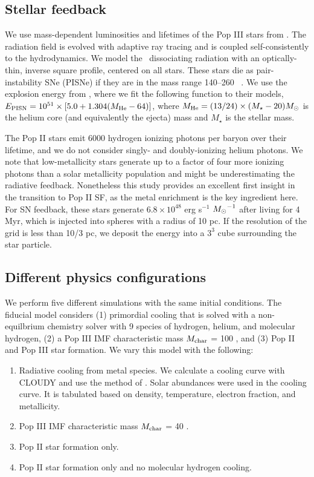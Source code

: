\documentclass[12pt,preprint]{aastex}
\begin{document}
\subsection{Stellar feedback}

We use mass-dependent luminosities and lifetimes of the Pop III stars
from \citet{Schaerer02}.  The radiation field is evolved with adaptive
ray tracing \citep{Abel02_RT, Wise10} and is coupled self-consistently
to the hydrodynamics.  We model the \hh~dissociating radiation with an
optically-thin, inverse square profile, centered on all stars.  These
stars die as pair-instability SNe (PISNe) if they are in the mass
range 140--260 \Ms~\citep{Heger03}.  We use the explosion energy from
\citet{Heger02}, where we fit the following function to their models,
$E_{\rm PISN} = 10^{51} \times [5.0 + 1.304 (M_{\rm He} - 64)]$, where
$M_{\rm He} = (13/24) \times (M_\star - 20) \Ms$ is the helium core
(and equivalently the ejecta) mass and $M_\star$ is the stellar mass.

The Pop II stars emit 6000 hydrogen ionizing photons per baryon over
their lifetime, and we do not consider singly- and doubly-ionizing
helium photons.  We note that low-metallicity stars generate up to a
factor of four more ionizing photons than a solar metallicity
population \citep{Schaerer03} and might be underestimating the
radiative feedback.  Nonetheless this study provides an excellent
first insight in the transition to Pop II SF, as the metal enrichment
is the key ingredient here.  For SN feedback, these stars generate
$6.8 \times 10^{48}$ erg s$^{-1}$ $\Ms^{-1}$ after living for 4 Myr,
which is injected into spheres with a radius of 10 pc.  If the
resolution of the grid is less than 10/3 pc, we deposit the energy
into a $3^3$ cube surrounding the star particle.

\subsection{Different physics configurations}

We perform five different simulations with the same initial
conditions.  The fiducial model considers (1) primordial cooling that
is solved with a non-equilbrium chemistry solver with 9 species of
hydrogen, helium, and molecular hydrogen, (2) a Pop III IMF
characteristic mass $M_{\rm char}$ = 100 \Ms, and (3) Pop II and Pop
III star formation.  We vary this model with the following:

\begin{enumerate}
\item Radiative cooling from metal species.  We calculate a cooling
  curve with CLOUDY \citep{CLOUDY} and use the method of
  \citep{2008MNRAS.385.1443S}.  Solar abundances were used in the
  cooling curve.  It is tabulated based on density, temperature,
  electron fraction, and metallicity.
\item Pop III IMF characteristic mass $M_{\rm char}$ = 40 \Ms.
\item Pop II star formation only.
\item Pop II star formation only and no molecular hydrogen cooling.
\end{enumerate}
\end{document}
